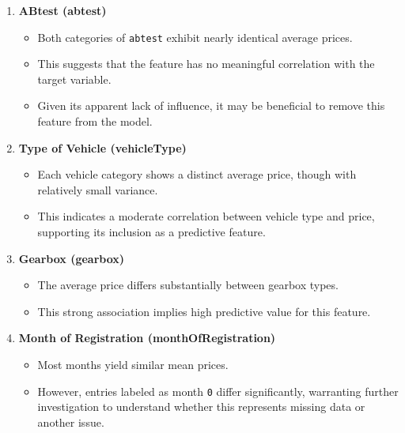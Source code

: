\documentclass[conference]{IEEEtran}
\begin{document}
\begin{enumerate}
    \item \textbf{ABtest (abtest)}
    \begin{itemize}
        \item Both categories of \texttt{abtest} exhibit nearly identical average prices.
        \item This suggests that the feature has no meaningful correlation with the target variable.
        \item Given its apparent lack of influence, it may be beneficial to
                remove this feature from the model.
    \end{itemize}

    \item \textbf{Type of Vehicle (vehicleType)}
    \begin{itemize}
        \item Each vehicle category shows a distinct average price, though with
                relatively small variance.
        \item This indicates a moderate correlation between vehicle type and
                price, supporting its inclusion as a predictive feature.
    \end{itemize}

    \item \textbf{Gearbox (gearbox)}
    \begin{itemize}
        \item The average price differs substantially between gearbox types.
        \item This strong association implies high predictive value for this
                feature.
    \end{itemize}

    \item \textbf{Month of Registration (monthOfRegistration)}
    \begin{itemize}
        \item Most months yield similar mean prices.
        \item However, entries labeled as month \texttt{0} differ
                significantly, warranting further investigation to understand
                whether this represents missing data or another issue.
    \end{itemize}


\end{enumerate}
\end{document}
